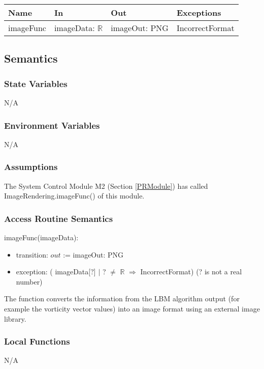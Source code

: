 \documentclass[12pt, titlepage]{article}
\begin{document}
\begin{center}
	\begin{tabular}{p{2cm} p{4cm} p{4cm} p{2cm}}
		\hline
		\textbf{Name} & \textbf{In} & \textbf{Out} & \textbf{Exceptions} \\
		\hline
		imageFunc & imageData: $\mathbb{R}$ & imageOut: PNG & IncorrectFormat \\
		\hline
	\end{tabular}
\end{center}

\subsection{Semantics}

\subsubsection{State Variables}
N/A

\subsubsection{Environment Variables}
N/A

\subsubsection{Assumptions}

The System Control Module M2 (Section \ref{PRModule}) has called ImageRendering.imageFunc() of this module.

\subsubsection{Access Routine Semantics}

\noindent imageFunc(imageData):
\begin{itemize}
	\item transition: $out$ := imageOut: PNG
	\item exception: ( imageData[?] $|$ ? $\neq$ $\mathbb{R}$ $\Rightarrow$ IncorrectFormat) (? is not a real number)
\end{itemize}

The function converts the information from the LBM algorithm output (for example the vorticity vector values) into an image format using an external image library.

\subsubsection{Local Functions}
N/A
\end{document}
